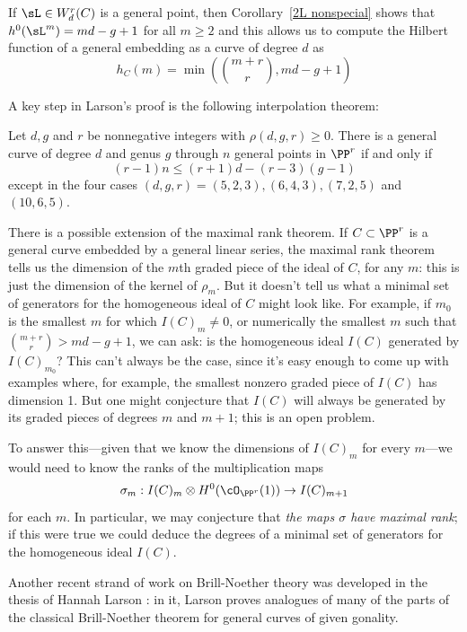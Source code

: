 If $\sL\in W^r_d(C)$ is a general point, then Corollary~\ref{2L nonspecial} shows that 
$h^0(\sL ^m) = md-g+1$ for all $m \geq 2$
and this allows us to compute the Hilbert function of a general embedding as a curve
of degree $d$ as 
 $$
 h_C(m) = \min(\binom{m+r}{r} , md-g+1)
 $$
 


A key step in Larson's proof is the following interpolation theorem:

\begin{theorem}\label{Larson-Vogt}
Let $d, g$ and $r$
be nonnegative integers with $\rho(d, g, r) \geq 0$. There is a general curve of degree $d$ and genus $g$ through $n$ general
points in $\PP^r$
if and only if
$$
(r-1)n \leq (r + 1)d-(r-3)(g-1)
$$
except in the four cases $(d, g, r) = (5, 2, 3),(6, 4, 3),(7, 2, 5)$ and $(10, 6, 5)$.

 \end{theorem}
 
There is a possible extension of the maximal rank theorem. If $C \subset \PP^r$ is a general curve embedded by a general linear series, the maximal rank theorem tells us the dimension of the $m$th graded piece of the ideal of $C$, for any $m$: this is just the dimension of the kernel of $\rho_m$. But it doesn't tell us what a minimal set of generators for the homogeneous ideal of $C$ might look like. For example, if $m_0$ is the smallest $m$ for which $I(C)_m \neq 0$, or numerically the smallest $m$ such that $\binom{m+r}{r} > md-g+1$, we can ask: is the homogeneous ideal $I(C)$ generated by $I(C)_{m_0}$? This can't always be the case, since it's easy enough to come up with examples where, for example, the  smallest nonzero graded piece of $I(C)$ has dimension 1. But one might conjecture that $I(C)$ will always be generated by its graded pieces of degrees $m$ and $m+1$; this is an open problem.

To answer this---given that we know the dimensions of $I(C)_m$ for every $m$---we would need to know the ranks of the multiplication maps
$$
\sigma_m : I(C)_m \otimes H^0(\cO_{\PP^r}(1)) \to I(C)_{m+1}
$$
for each $m$. In particular, we may conjecture that \emph{the maps $\sigma$ have maximal rank}; if this were true we could deduce the degrees of a minimal set of generators for the homogeneous ideal $I(C)$.

Another recent strand of work on Brill-Noether theory was developed in the thesis of Hannah Larson
\cite{HLarson}: in it, Larson proves analogues of many of the parts of the classical Brill-Noether theorem
for general curves of given gonality.


